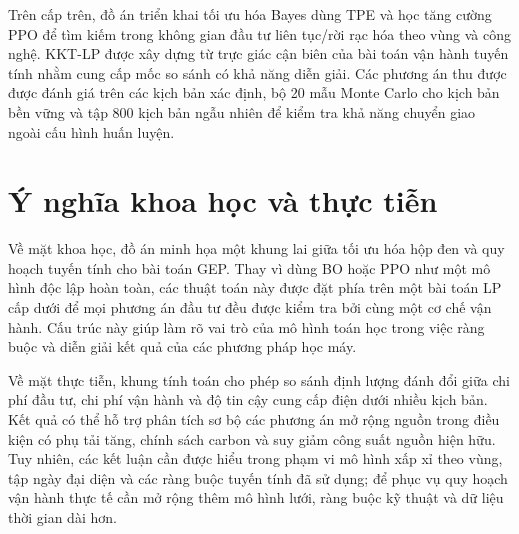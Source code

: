 Trên cấp trên, đồ án triển khai tối ưu hóa Bayes dùng TPE và học tăng cường PPO để tìm kiếm trong không gian đầu tư liên tục/rời rạc hóa theo vùng và công nghệ. KKT-LP được xây dựng từ trực giác cận biên của bài toán vận hành tuyến tính nhằm cung cấp mốc so sánh có khả năng diễn giải. Các phương án thu được được đánh giá trên các kịch bản xác định, bộ 20 mẫu Monte Carlo cho kịch bản bền vững và tập 800 kịch bản ngẫu nhiên để kiểm tra khả năng chuyển giao ngoài cấu hình huấn luyện.

\section{Ý nghĩa khoa học và thực tiễn}

Về mặt khoa học, đồ án minh họa một khung lai giữa tối ưu hóa hộp đen và quy hoạch tuyến tính cho bài toán GEP. Thay vì dùng BO hoặc PPO như một mô hình độc lập hoàn toàn, các thuật toán này được đặt phía trên một bài toán LP cấp dưới để mọi phương án đầu tư đều được kiểm tra bởi cùng một cơ chế vận hành. Cấu trúc này giúp làm rõ vai trò của mô hình toán học trong việc ràng buộc và diễn giải kết quả của các phương pháp học máy.

Về mặt thực tiễn, khung tính toán cho phép so sánh định lượng đánh đổi giữa chi phí đầu tư, chi phí vận hành và độ tin cậy cung cấp điện dưới nhiều kịch bản. Kết quả có thể hỗ trợ phân tích sơ bộ các phương án mở rộng nguồn trong điều kiện có phụ tải tăng, chính sách carbon và suy giảm công suất nguồn hiện hữu. Tuy nhiên, các kết luận cần được hiểu trong phạm vi mô hình xấp xỉ theo vùng, tập ngày đại diện và các ràng buộc tuyến tính đã sử dụng; để phục vụ quy hoạch vận hành thực tế cần mở rộng thêm mô hình lưới, ràng buộc kỹ thuật và dữ liệu thời gian dài hơn.
 
